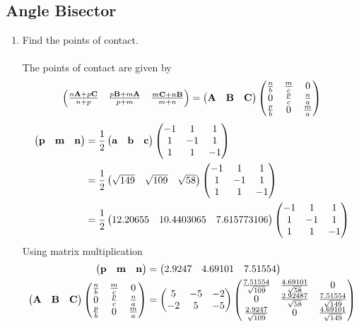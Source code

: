 \documentclass[10pt]{book}
\begin{document}
\subsection{Angle Bisector}
\begin{enumerate}[label=\thesubsection.\arabic*.,ref=\thesubsection.\theenumi]
\item Find the points of contact. \\ 
\solution\\
The points of contact are given by 
\begin{align}
\begin{pmatrix}	\frac{n\mathbf{A}+p\mathbf{C}}{n+p}
&
\frac{p\mathbf{B}+m\mathbf{A}}{p+m}
&
\frac{m\mathbf{C}+n\mathbf{B}}{m+n}
\end{pmatrix}
= 	\begin{pmatrix}\mathbf{A} & \mathbf{B} &\mathbf{C}\end{pmatrix}\begin{pmatrix}\frac{n}{b} & \frac{m}{c} & 0\\0 & \frac{p}{c} & \frac{n}{a} \\\frac{p}{b} & 0 & \frac{m}{a}\end{pmatrix}
\end{align}
\begin{align}
    \begin{pmatrix}\mathbf{p} & \mathbf{m} & \mathbf{n} \end{pmatrix} &=\frac{1}{2} \begin{pmatrix}\mathbf{a} & \mathbf{b} & \mathbf{c}\end{pmatrix} \begin{pmatrix} -1 & 1 & 1 \\1 & -1 & 1 \\1 & 1 & -1 \end{pmatrix} \\
   &= \frac{1}{2}\begin{pmatrix} \sqrt{149}&  \sqrt{109} & \sqrt{58} \end{pmatrix}\begin{pmatrix} -1 & 1 & 1 \\1 & -1 & 1 \\1 & 1 & -1 \end{pmatrix}  \\
   &= \frac{1}{2}\begin{pmatrix} 12.20655& 10.4403065 & 7.615773106 \end{pmatrix}\begin{pmatrix} -1 & 1 & 1 \\1 & -1 & 1 \\1 & 1 & -1 \end{pmatrix}
\end{align}
Using matrix multiplication 
\begin{align}
        \begin{pmatrix}\mathbf{p} & \mathbf{m} & \mathbf{n} \end{pmatrix} &= \begin{pmatrix}2.9247& 4.69101 & 7.51554 \end{pmatrix}   \\
\begin{pmatrix}\mathbf{A} & \mathbf{B} &\mathbf{C}\end{pmatrix}\begin{pmatrix}\frac{n}{b} & \frac{m}{c} & 0\\0 & \frac{p}{c} & \frac{n}{a} \\\frac{p}{b} & 0 & \frac{m}{a}\end{pmatrix} 
  &= \begin{pmatrix}5 & -5 & -2 \\ -2 & 5 & -5\end{pmatrix} \begin{pmatrix}\frac{7.51554}{\sqrt{109}} & \frac{4.69101 }{\sqrt{58}} & 0\\0 & \frac{2.92487}{\sqrt{58}} & \frac{7.51554}{\sqrt{149}} \\\frac{2.9247}{\sqrt{109}} & 0 & \frac{4.69101 }{\sqrt{149}}\end{pmatrix}
\end{align}

\end{enumerate}
\end{document}
